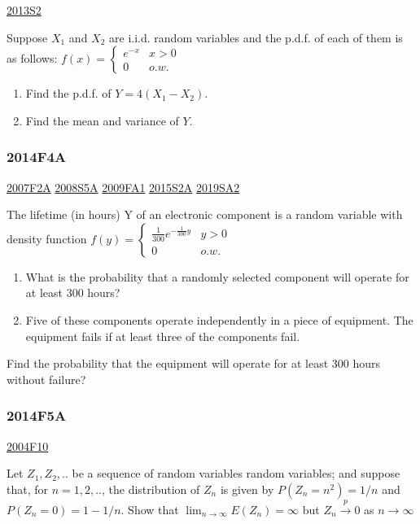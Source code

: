 \documentclass[6pt,twocolumn,Portrait]{article}
\begin{document}
\protect\hyperlink{s2-3}{2013S2}

Suppose \(X_1\) and \(X_2\) are i.i.d. random variables and the p.d.f.
of each of them is as follows:
\(f(x)=\begin{cases}e^{-x}& x>0\\0& o.w.\end{cases}\)

\begin{enumerate}
\def\labelenumi{(\alph{enumi})}
\item
  Find the p.d.f. of \(Y=4(X_1-X_2)\).
\item
  Find the mean and variance of \(Y\).
\end{enumerate}

\hypertarget{f4a-1}{%
\subsubsection{2014F4A}\label{f4a-1}}

\protect\hyperlink{f2a}{2007F2A} \protect\hyperlink{s5a}{2008S5A}
\protect\hyperlink{fa1}{2009FA1} \protect\hyperlink{s2a-1}{2015S2A}
\protect\hyperlink{sa2-3}{2019SA2}

The lifetime (in hours) Y of an electronic component is a random
variable with density function
\(f(y)=\begin{cases}\frac1{300}e^{-\frac1{300}y}& y>0\\0& o.w.\end{cases}\)

\begin{enumerate}
\def\labelenumi{(\alph{enumi})}
\item
  What is the probability that a randomly selected component will
  operate for at least 300 hours?
\item
  Five of these components operate independently in a piece of
  equipment. The equipment fails if at least three of the components
  fail.
\end{enumerate}

Find the probability that the equipment will operate for at least 300
hours without failure?

\hypertarget{f5a-1}{%
\subsubsection{2014F5A}\label{f5a-1}}

\protect\hyperlink{f10}{2004F10}

Let \(Z_1,Z_2,..\) be a sequence of random variables random variables;
and suppose that, for \(n=1,2,..\), the distribution of \(Z_n\) is given
by \(P(Z_n=n^2)=1/n\) and \(P(Z_n=0)=1-1/n\). Show that
\(\lim_{n\to\infty}E(Z_n)=\infty\) but \(Z_n\overset{p}\to0\) as
\(n\to\infty\)
\end{document}

